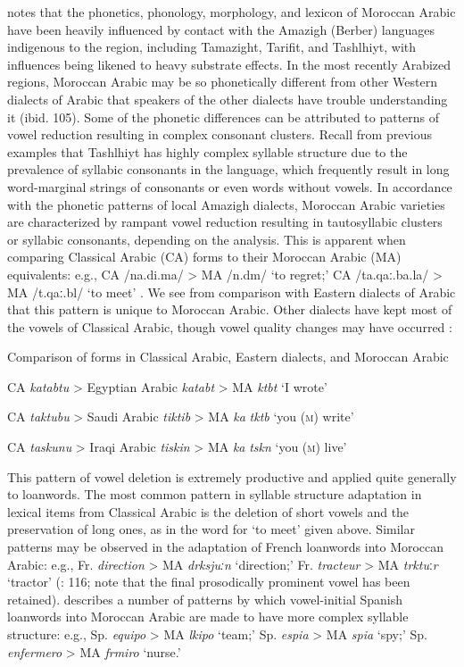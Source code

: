   \citet{Chtatou1997} notes that the phonetics, phonology, morphology, and lexicon of Moroccan Arabic have been heavily influenced by contact with the Amazigh (Berber) languages indigenous to the region, including Tamazight, Tarifit, and Tashlhiyt, with influences being likened to heavy substrate effects. In the most recently Arabized regions, Moroccan Arabic may be so phonetically different from other Western dialects of Arabic that speakers of the other dialects have trouble understanding it (ibid. 105). Some of the phonetic differences can be attributed to patterns of vowel reduction resulting in complex consonant clusters. Recall from previous examples that Tashlhiyt has highly complex syllable structure due to the prevalence of syllabic consonants in the language, which frequently result in long word-marginal strings of consonants or even words without vowels. In accordance with the phonetic patterns of local Amazigh dialects, Moroccan Arabic varieties are characterized by rampant vowel reduction resulting in tautosyllabic clusters or syllabic consonants, depending on the analysis. This is apparent when comparing Classical Arabic (CA) forms to their Moroccan Arabic (MA) equivalents: e.g., CA /na.di.ma/ > MA /n.dm/ ‘to regret;’ CA /ta.qaː.ba.la/ > MA /t.qaː.bl/ ‘to meet’ \citep[110]{Chtatou1997}. We see from comparison with Eastern dialects of Arabic that this pattern is unique to Moroccan Arabic. Other dialects have kept most of the vowels of Classical Arabic, though vowel quality changes may have occurred :

\ea\label{ex:(8.5)}
  Comparison of forms in Classical Arabic, Eastern dialects, and Moroccan Arabic

  CA \textit{katabtu} > Egyptian Arabic \textit{katabt} > MA \textit{ktbt} ‘I wrote’ 

  CA \textit{taktubu} > Saudi Arabic \textit{tiktib} > MA \textit{ka} \textit{tktb} ‘you (\textsc{m}) write’

  CA \textit{taskunu} > Iraqi Arabic \textit{tiskin} > MA \textit{ka} \textit{tskn} ‘you (\textsc{m}) live’

\citep[111-12]{Chtatou1997}

\z

This pattern of vowel deletion is extremely productive and applied quite generally to loanwords. The most common pattern in syllable structure adaptation in lexical items from Classical Arabic is the deletion of short vowels and the preservation of long ones, as in the word for ‘to meet’ given above. Similar patterns may be observed in the adaptation of French loanwords into Moroccan Arabic: e.g., Fr. \textit{direction} > MA \textit{drksjuːn} ‘direction;’ Fr. \textit{tracteur} > MA \textit{trktu}ː\textit{r} ‘tractor’ (\citealt{Chatou1997}: 116; note that the final prosodically prominent vowel has been retained). \citet{Sayahi2005} describes a number of patterns by which vowel-initial Spanish loanwords into Moroccan Arabic are made to have more complex syllable structure: e.g., Sp. \textit{equipo} > MA \textit{lkipo} ‘team;’ Sp. \textit{espia} > MA \textit{spia} ‘spy;’ Sp. \textit{enfermero} > MA \textit{frmiro} ‘nurse.’

